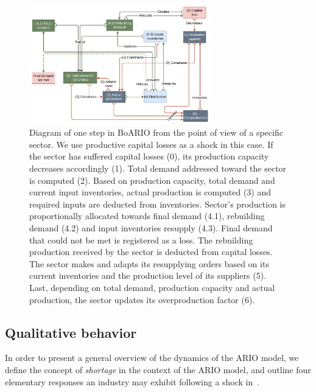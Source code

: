 \documentclass[main.tex]{subfiles}
\begin{document}
\begin{figure}[h]
  \centering
  \includegraphics[width=0.70\textwidth]{imgs/BoARIO-diagram-10.pdf}
  \caption[BoARIO process diagram]{\small Diagram of one step in BoARIO
    from the point of view of a specific sector. We use productive capital
    losses as a shock in this case. If the sector has suffered capital
    losses (0), its production capacity decreases accordingly (1). Total demand
    addressed toward the sector is computed (2). Based on production capacity,
    total demand and current input inventories, actual production is computed
    (3) and required inputs are deducted from inventories. Sector's production
    is proportionally allocated towards final demand (4.1), rebuilding demand
    (4.2) and input
    inventories resupply (4.3). Final demand that could not be met
    is registered as a loss. The rebuilding production received by the sector
    is deducted from capital losses. The sector makes and adapts its
    resupplying orders based on its current inventories and the production level
    of its suppliers (5). Last, depending on total demand, production capacity
    and actual production, the sector updates its overproduction factor (6).}
  \label{fig:boario_sketch_1}
\end{figure}


\subsection{Qualitative behavior}
\label{sec:qualitative-behavior}

In order to present a general overview of the dynamics of the ARIO model,
we define the concept of \emph{shortage} in the context of the ARIO model, and
outline four elementary responses an industry may exhibit following a shock in~.

\end{document}
